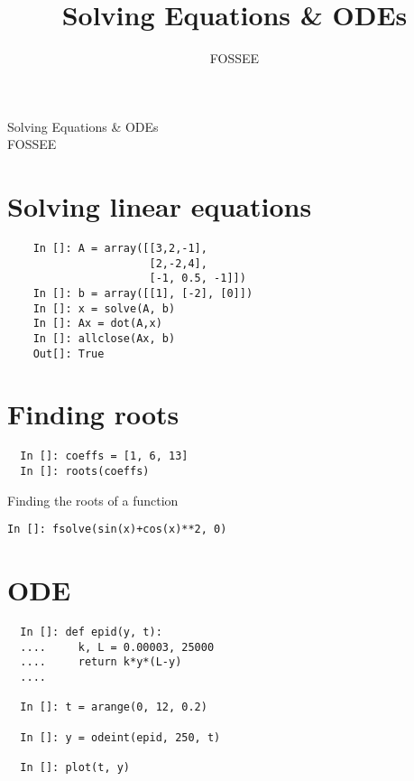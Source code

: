 \documentclass[12pt]{article}
\title{Solving Equations \& ODEs}
\author{FOSSEE}
\begin{document}
\date{}
\vspace{-1in}
\begin{center}
\LARGE{Solving Equations \& ODEs}\\
\large{FOSSEE}
\end{center}
\section{Solving linear equations}
\begin{verbatim}
    In []: A = array([[3,2,-1],
                      [2,-2,4],                   
                      [-1, 0.5, -1]])
    In []: b = array([[1], [-2], [0]])
    In []: x = solve(A, b)
    In []: Ax = dot(A,x)
    In []: allclose(Ax, b)
    Out[]: True
\end{verbatim}
\section{Finding roots}
\begin{verbatim}
  In []: coeffs = [1, 6, 13]
  In []: roots(coeffs)
\end{verbatim}
Finding the roots of a function
\begin{verbatim}
In []: fsolve(sin(x)+cos(x)**2, 0)
\end{verbatim}
\section{ODE}
\begin{verbatim}
  In []: def epid(y, t):
  ....     k, L = 0.00003, 25000
  ....     return k*y*(L-y)
  ....
  
  In []: t = arange(0, 12, 0.2)

  In []: y = odeint(epid, 250, t)

  In []: plot(t, y)
\end{verbatim}
\end{document}
